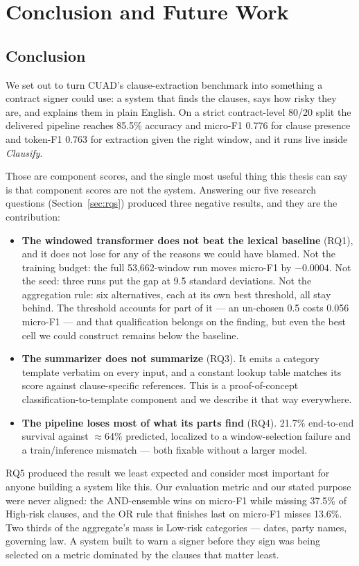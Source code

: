\chapter{Conclusion and Future Work}

\section{Conclusion}
We set out to turn CUAD's clause-extraction benchmark into something a contract signer could use: a system that finds the clauses, says how risky they are, and explains them in plain English. On a strict contract-level 80/20 split the delivered pipeline reaches 85.5\% accuracy and micro-F1 0.776 for clause presence and token-F1 0.763 for extraction given the right window, and it runs live inside \emph{Clausify}.

Those are component scores, and the single most useful thing this thesis can say is that component scores are not the system. Answering our five research questions (Section~\ref{sec:rqs}) produced three negative results, and they are the contribution:

\begin{itemize}[itemsep=3pt]
  \item \textbf{The windowed transformer does not beat the lexical baseline} (RQ1), and it does not lose for any of the reasons we could have blamed. Not the training budget: the full 53{,}662-window run moves micro-F1 by $-0.0004$. Not the seed: three runs put the gap at 9.5 standard deviations. Not the aggregation rule: six alternatives, each at its own best threshold, all stay behind. The threshold accounts for part of it --- an un-chosen 0.5 costs 0.056 micro-F1 --- and that qualification belongs on the finding, but even the best cell we could construct remains below the baseline.
  \item \textbf{The summarizer does not summarize} (RQ3). It emits a category template verbatim on every input, and a constant lookup table matches its score against clause-specific references. This is a proof-of-concept classification-to-template component and we describe it that way everywhere.
  \item \textbf{The pipeline loses most of what its parts find} (RQ4). 21.7\% end-to-end survival against $\approx$64\% predicted, localized to a window-selection failure and a train/inference mismatch --- both fixable without a larger model.
\end{itemize}

RQ5 produced the result we least expected and consider most important for anyone building a system like this. Our evaluation metric and our stated purpose were never aligned: the AND-ensemble wins on micro-F1 while missing 37.5\% of High-risk clauses, and the OR rule that finishes last on micro-F1 misses 13.6\%. Two thirds of the aggregate's mass is Low-risk categories --- dates, party names, governing law. A system built to warn a signer before they sign was being selected on a metric dominated by the clauses that matter least.


